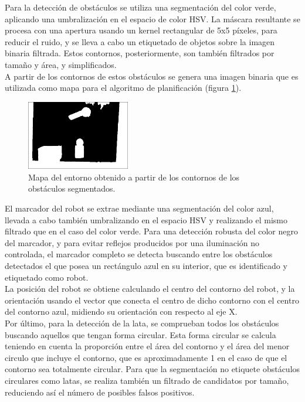 Para la detección de obstáculos se utiliza una segmentación del color verde, aplicando una umbralización en el espacio de color HSV. La máscara resultante se procesa con una apertura usando un kernel rectangular de 5x5 píxeles, para reducir el ruido, y se lleva a cabo un etiquetado de objetos sobre la imagen binaria filtrada. Estos contornos, posteriormente, son también filtrados por tamaño y área, y simplificados.\\

A partir de los contornos de estos obstáculos se genera una imagen binaria que es utilizada como mapa para el algoritmo de planificación (figura \ref{fig:map}).\\

\begin{figure}[H]
        \centering
        \includegraphics[width=0.4\textwidth]{images/map.png}
        \caption{Mapa del entorno obtenido a partir de los contornos de los obstáculos segmentados.}
        \label{fig:map}
\end{figure} 

El marcador del robot se extrae mediante una segmentación del color azul, llevada a cabo también umbralizando en el espacio HSV y realizando el mismo filtrado que en el caso del color verde. Para una detección robusta del color negro del marcador, y para evitar reflejos producidos por una iluminación no controlada, el marcador completo se detecta buscando entre los obstáculos detectados el que posea un rectángulo azul en su interior, que es identificado y etiquetado como robot.\\ 

La posición del robot se obtiene calculando el centro del contorno del robot, y la orientación usando el vector que conecta el centro de dicho contorno con el centro del contorno azul, midiendo su orientación con respecto al eje X.\\

Por último, para la detección de la lata, se comprueban todos los obstáculos buscando aquellos que tengan forma circular. Esta forma circular se calcula teniendo en cuenta la proporción entre el área del contorno y el área del menor circulo que incluye el contorno, que es aproximadamente 1 en el caso de que el contorno sea totalmente circular. Para que la segmentación no etiquete obstáculos circulares como latas, se realiza también un filtrado de candidatos por tamaño, reduciendo así el número de posibles falsos positivos.\\

